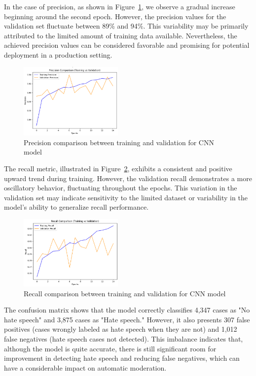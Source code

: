 In the case of precision, as shown in Figure~\ref{fig:cnn_precision}, we observe a gradual increase beginning around the second epoch. However, the precision values for the validation set fluctuate between 89\% and 94\%. This variability may be primarily attributed to the limited amount of training data available. Nevertheless, the achieved precision values can be considered favorable and promising for potential deployment in a production setting.

\begin{figure}[H]
    \centering
    \includegraphics[width=0.45\textwidth]{images/PrecisionComparisonCNN.png}
    \caption{Precision comparison between training and validation for CNN model}
    \label{fig:cnn_precision}
\end{figure}

The recall metric, illustrated in Figure~\ref{fig:cnn_recall}, exhibits a consistent and positive upward trend during training. However, the validation recall demonstrates a more oscillatory behavior, fluctuating throughout the epochs. This variation in the validation set may indicate sensitivity to the limited dataset or variability in the model's ability to generalize recall performance.

\begin{figure}[H]
    \centering
    \includegraphics[width=0.45\textwidth]{images/RecallComparisonCNN.png}
    \caption{Recall comparison between training and validation for CNN model}
    \label{fig:cnn_recall}
\end{figure}
 
The confusion matrix shows that the model correctly classifies 4,347 cases as "No hate speech" and 3,875 cases as "Hate speech." However, it also presents 307 false positives (cases wrongly labeled as hate speech when they are not) and 1,012 false negatives (hate speech cases not detected). This imbalance indicates that, although the model is quite accurate, there is still significant room for improvement in detecting hate speech and reducing false negatives, which can have a considerable impact on automatic moderation.

